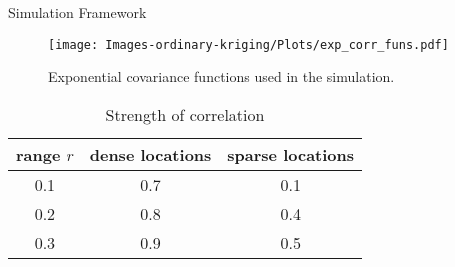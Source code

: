 \documentclass{beamer}
\begin{document}
\begin{frame}[t]{Simulation Framework}
	\begin{figure}[h]
		\begin{center}
			\texttt{[image: Images-ordinary-kriging/Plots/exp\_corr\_funs.pdf]}
		\end{center}
		\caption{Exponential covariance functions used in the simulation.} \label{fig:exp_corr_funs}
	\end{figure}
	\begin{table}
		\begin{center}
			\caption{Strength of correlation}
	\begin{tabular}{|c|c|c|}
		\hline
		range $r$ & dense locations & sparse locations \\
		\hline
		0.1 & 0.7 & 0.1 \\
		0.2 & 0.8 & 0.4 \\
		0.3 & 0.9 & 0.5 \\
		\hline
	\end{tabular}
	\label{tab:corr values}
	\end{center}
	\end{table}
\end{frame}

\end{document}
